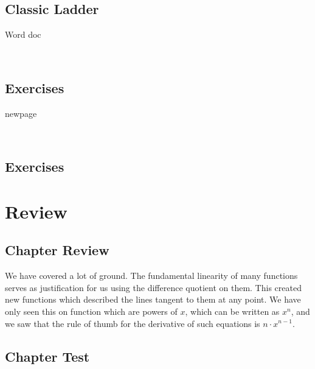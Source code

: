 \subsection{Classic Ladder}
Word doc
\newpage

~\vfill
\subsection{Exercises}
\noindent{}
newpage
\noindent{}
\newpage
\noindent{}
\newpage
\noindent{}




{}
\noindent{}
\newpage

~\vfill
\subsection{Exercises}
\noindent{}
\newpage
\noindent{}
\newpage
\noindent{}





\newpage

\section{Review}
\subsection{Chapter Review}
We have covered a lot of ground.  The fundamental linearity of many functions serves
as justification for us using the difference quotient on them.  This created new functions which 
described the lines tangent to them at any point.  We have only seen this on function which are
powers of $x$, which can be written as $x^n$, and we saw that the rule of thumb for the
derivative of such equations is $n\cdot x^{n-1}$.
\subsection{Chapter Test}



